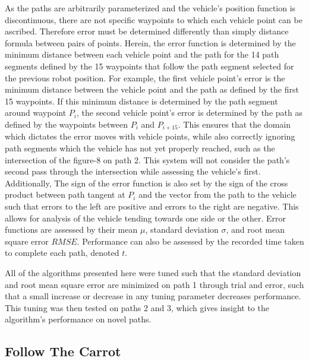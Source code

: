 \documentclass[mla8alt]{mla}
\begin{document}
\begin{paper}
As the paths are arbitrarily parameterized and the vehicle's position function is discontinuous, there are not specific waypoints to which each vehicle point can be ascribed. Therefore error must be determined differently than simply distance formula between pairs of points. Herein, the error function is determined by the minimum distance between each vehicle point and the path for the 14 path segments defined by the 15 waypoints that follow the path segment selected for the previous robot position. For example, the first vehicle point's error is the minimum distance between the vehicle point and the path as defined by the first 15 waypoints. If this minimum distance is determined by the path segment around waypoint $P_i$, the second vehicle point's error is determined by the path as defined by the waypoints between $P_i$ and $P_{i+15}$. This ensures that the domain which dictates the error moves with vehicle points, while also correctly ignoring path segments which the vehicle has not yet properly reached, such as the intersection of the figure-8 on path 2. This system will not consider the path's second pass through the intersection while assessing the vehicle's first. Additionally, The sign of the error function is also set by the sign of the cross product between path tangent at $P_i$ and the vector from the path to the vehicle such that errors to the left are positive and errors to the right are negative. This allows for analysis of the vehicle tending towards one side or the other. Error functions are assessed by their mean $\mu$, standard deviation $\sigma$, and root mean square error $RMSE$. Performance can also be assessed by the recorded time taken to complete each path, denoted $t$.

All of the algorithms presented here were tuned such that the standard deviation and root mean square error are minimized on path 1 through trial and error, such that a small increase or decrease in any tuning parameter decreases performance. This tuning was then tested on paths 2 and 3, which gives insight to the algorithm's performance on novel paths.

\subsection{Follow The Carrot}


\end{paper}
\end{document}
